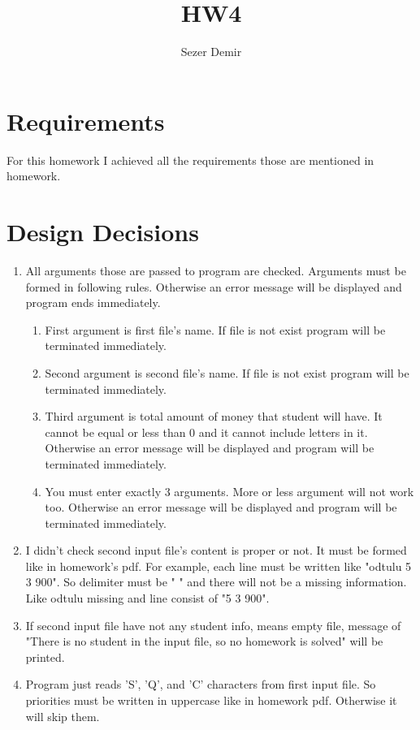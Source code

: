 \documentclass{article}
\title{HW4}
\author{Sezer Demir }
\begin{document}
\maketitle
\section{Requirements}

\setlength{\parindent}{8ex}
\hspace{\parindent} For this homework I achieved all the requirements those are mentioned in homework.\par
\section{Design Decisions}

\begin{enumerate}[label=\alph*.), leftmargin=1.5\parindent]
  \item All arguments those are passed to program are checked. Arguments must be formed in following rules. Otherwise an error message will be displayed and program ends immediately. 
    \begin{enumerate}[label=\arabic*.), leftmargin=1.5\parindent]
        \item First argument is first file's name. If file is not exist program will be terminated immediately.
        \item Second argument is second file's name. If file is not exist program will be terminated immediately.
        \item Third argument is total amount of money that student will have. It cannot be equal or less than 0 and it cannot include letters in it. Otherwise an error message will be displayed and program will be terminated immediately.
        \item You must enter exactly 3 arguments. More or less argument will not work too. Otherwise an error message will be displayed and program will be terminated immediately.
    \end{enumerate}
  \item I didn't check second input file's content is proper or not. It must be formed like in homework's pdf. For example, each line must be written like "odtulu 5 3 900". So delimiter must be " " and there will not be a missing information. Like odtulu missing and line consist of "5 3 900".
  \item If second input file have not any student info, means empty file, message of "There is no student in the input file, so no homework is solved" will be printed.
  \item Program just reads 'S', 'Q', and 'C' characters from first input file. So priorities must be written in uppercase like in homework pdf. Otherwise it will skip them.
  
\end{enumerate}
\end{document}
